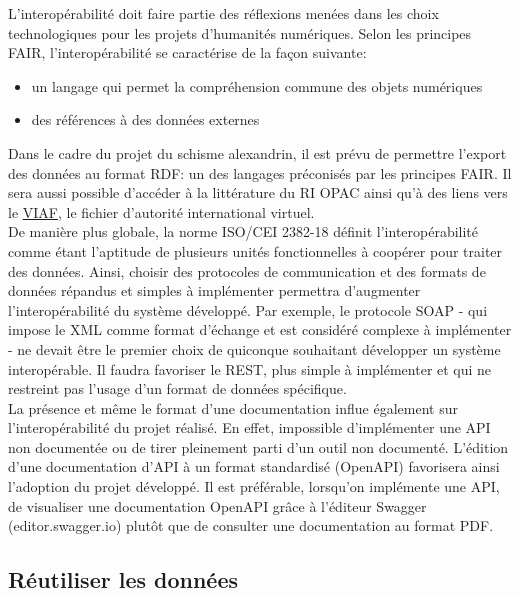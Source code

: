 L’interopérabilité doit faire partie des réflexions menées dans les choix technologiques pour les projets d’humanités numériques. Selon les principes FAIR, l’interopérabilité se caractérise de la façon suivante:\\
\begin{itemize} 
\item un langage qui permet la compréhension commune des objets numériques
\item des références à des données externes\\
\end{itemize}
Dans le cadre du projet du schisme alexandrin, il est prévu  de permettre l’export des données au format RDF: un des langages préconisés par les principes FAIR. 
Il sera aussi possible d’accéder à la littérature du RI OPAC ainsi qu’à des liens vers le \href{https://viaf.org/}{VIAF}, le fichier d’autorité international virtuel.\\
De manière plus globale, la norme ISO/CEI 2382-18 définit l’interopérabilité comme étant l’aptitude de plusieurs unités fonctionnelles à coopérer pour traiter des données. Ainsi, choisir des protocoles de communication et des formats de données répandus et simples à implémenter permettra d’augmenter l’interopérabilité du système développé. Par exemple, le protocole SOAP - qui impose le XML comme format d’échange et est considéré complexe à implémenter - ne devait être le premier choix de quiconque souhaitant développer un système interopérable. Il faudra favoriser le REST, plus simple à implémenter et qui ne restreint pas l’usage d’un format de données spécifique.\\
La présence et même le format d’une documentation influe également sur l’interopérabilité du projet réalisé. En effet, impossible d’implémenter une API non documentée ou de tirer pleinement parti d’un outil non documenté. L’édition d’une documentation d’API à un format standardisé (OpenAPI) favorisera ainsi l’adoption du projet développé. Il est préférable, lorsqu’on implémente une API, de visualiser une documentation OpenAPI grâce à l’éditeur Swagger (editor.swagger.io) plutôt que de consulter une documentation au format PDF.

    \subsection{Réutiliser les données}